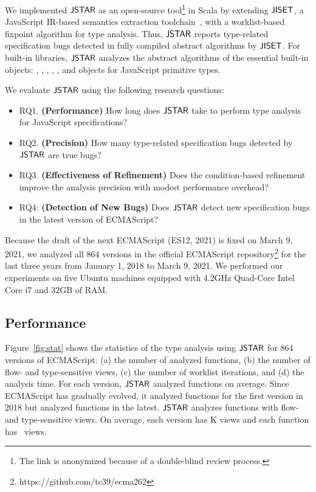 We implemented $\tool$ as an open-source tool\footnote{The link is anonymized
because of a double-blind review process.} in Scala by extending $\jiset$, a
JavaScript IR-based semantics extraction toolchain~\cite{jiset}, with a worklist-based
fixpoint algorithm for type analysis. Thus, $\tool$ reports type-related specification bugs
detected in fully compiled abstract algorithms by $\jiset$.  For built-in libraries,
$\tool$ analyzes the abstract algorithms of the essential built-in objects: ,
, , , , and objects
for JavaScript primitive types.

We evaluate $\tool$ using the following research questions:
\begin{itemize}
  \item RQ1. \textbf{(Performance)} How long does $\tool$ take to perform type
    analysis for JavaScript specifications?
  \item RQ2. \textbf{(Precision)} How many type-related specification bugs
    detected by $\tool$ are true bugs?
  \item RQ3. \textbf{(Effectiveness of Refinement)} Does the condition-based refinement
    improve the analysis precision with modest performance overhead?
  \item RQ4: \textbf{(Detection of New Bugs)} Does $\tool$ detect new
    specification bugs in the latest version of ECMAScript?
\end{itemize}
Because the draft of the next ECMAScript (ES12, 2021) is fixed on March 9,
2021, we analyzed all 864 versions in the official
ECMAScript repository\footnote{https://github.com/tc39/ecma262} for the last
three years from January 1, 2018 to March 9, 2021.  We performed our experiments
on five Ubuntu machines equipped with 4.2GHz Quad-Core Intel Core i7 and 32GB of
RAM.


\subsection{Performance}\label{sec:performance}

Figure~\ref{fig:stat} shows the statistics of the type analysis using $\tool$ for
864 versions of ECMAScript: (a) the number of analyzed functions, (b) the number
of flow- and type-sensitive views, (c) the number of worklist iterations, and
(d) the analysis time.  For each version, $\tool$ analyzed
 functions on average.  Since ECMAScript has gradually evolved,
it analyzed  functions for the first version in 2018
but analyzed  functions in the latest.
$\tool$ analyzes functions with flow- and type-sensitive views.
On average, each version has K views and each function has
~views.

